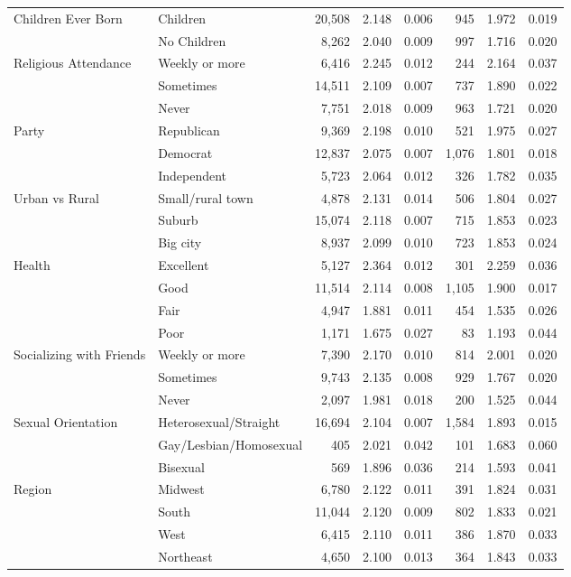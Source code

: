 \begin{table}[htbp]
\begin{tabular}{llrrrrrr}
\midrule
Children Ever Born & Children & 20,508 & 2.148 & 0.006 & 945 & 1.972 & 0.019 \\
 & No Children & 8,262 & 2.040 & 0.009 & 997 & 1.716 & 0.020 \\
\midrule
Religious Attendance & Weekly or more & 6,416 & 2.245 & 0.012 & 244 & 2.164 & 0.037 \\
 & Sometimes & 14,511 & 2.109 & 0.007 & 737 & 1.890 & 0.022 \\
 & Never & 7,751 & 2.018 & 0.009 & 963 & 1.721 & 0.020 \\
\midrule
Party & Republican & 9,369 & 2.198 & 0.010 & 521 & 1.975 & 0.027 \\
 & Democrat & 12,837 & 2.075 & 0.007 & 1,076 & 1.801 & 0.018 \\
 & Independent & 5,723 & 2.064 & 0.012 & 326 & 1.782 & 0.035 \\
\midrule
Urban vs Rural & Small/rural town & 4,878 & 2.131 & 0.014 & 506 & 1.804 & 0.027 \\
 & Suburb & 15,074 & 2.118 & 0.007 & 715 & 1.853 & 0.023 \\
 & Big city & 8,937 & 2.099 & 0.010 & 723 & 1.853 & 0.024 \\
\midrule
Health & Excellent & 5,127 & 2.364 & 0.012 & 301 & 2.259 & 0.036 \\
 & Good & 11,514 & 2.114 & 0.008 & 1,105 & 1.900 & 0.017 \\
 & Fair & 4,947 & 1.881 & 0.011 & 454 & 1.535 & 0.026 \\
 & Poor & 1,171 & 1.675 & 0.027 & 83 & 1.193 & 0.044 \\
\midrule
Socializing with Friends & Weekly or more & 7,390 & 2.170 & 0.010 & 814 & 2.001 & 0.020 \\
 & Sometimes & 9,743 & 2.135 & 0.008 & 929 & 1.767 & 0.020 \\
 & Never & 2,097 & 1.981 & 0.018 & 200 & 1.525 & 0.044 \\
\midrule
Sexual Orientation & Heterosexual/Straight & 16,694 & 2.104 & 0.007 & 1,584 & 1.893 & 0.015 \\
 & Gay/Lesbian/Homosexual & 405 & 2.021 & 0.042 & 101 & 1.683 & 0.060 \\
 & Bisexual & 569 & 1.896 & 0.036 & 214 & 1.593 & 0.041 \\
\midrule
Region & Midwest & 6,780 & 2.122 & 0.011 & 391 & 1.824 & 0.031 \\
 & South & 11,044 & 2.120 & 0.009 & 802 & 1.833 & 0.021 \\
 & West & 6,415 & 2.110 & 0.011 & 386 & 1.870 & 0.033 \\
 & Northeast & 4,650 & 2.100 & 0.013 & 364 & 1.843 & 0.033 \\
\bottomrule
\end{tabular}
\end{table}
